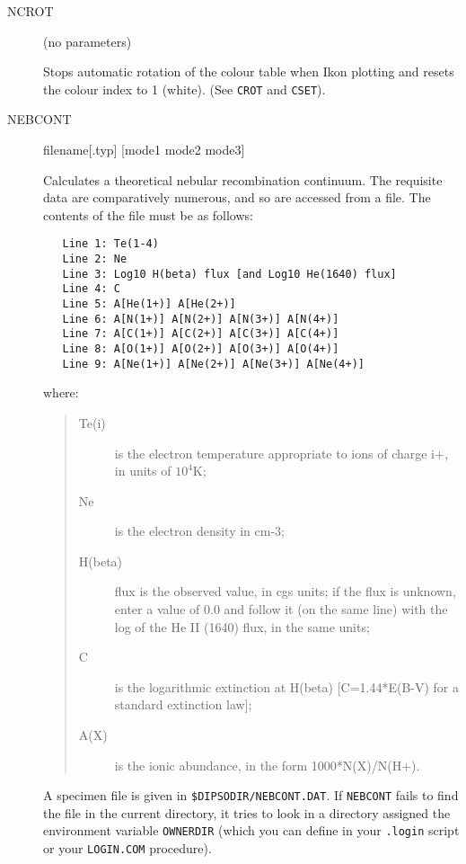 \documentclass[twoside,11pt]{article}
\newcommand{\htmlref}[2]{#1}
\newcommand{\xlabel}[1]{}
\renewcommand{\_}{\texttt{\symbol{95}}}
\newcommand{\dipcom}[3] { \item [{#1}] {#2} \par }
\newcommand{\dipcom}[3] { \end{description}
                            \subsection{\xlabel{#1}{#1} - {#3}}
                            \label{COM:#1}
                            \begin{description}
                            \item [Syntax:] {\tt{#1} {#2}}
                            \par
                            \item [Description:]}
\begin{document}
\begin {description}
\dipcom{NCROT}{(no parameters)}{Stops automatic rotation of the colour table}
Stops automatic rotation of the colour table when Ikon plotting and
resets the colour index to 1 (white). (See \htmlref{{\tt{CROT}}}{COM:CROT}  and \htmlref{{\tt{CSET}}}{COM:CSET}). 

\dipcom{NEBCONT}{filename[.typ] [mode1 mode2 mode3]}{Calculates a theoretical nebular re-combination continuum}
Calculates a theoretical nebular recombination continuum. The
requisite data are comparatively numerous, and so are accessed from a
file. The contents of the file must be as follows:

\begin{verbatim}
   Line 1: Te(1-4)
   Line 2: Ne
   Line 3: Log10 H(beta) flux [and Log10 He(1640) flux]
   Line 4: C
   Line 5: A[He(1+)] A[He(2+)]
   Line 6: A[N(1+)] A[N(2+)] A[N(3+)] A[N(4+)]
   Line 7: A[C(1+)] A[C(2+)] A[C(3+)] A[C(4+)]
   Line 8: A[O(1+)] A[O(2+)] A[O(3+)] A[O(4+)]
   Line 9: A[Ne(1+)] A[Ne(2+)] A[Ne(3+)] A[Ne(4+)]
\end{verbatim}

where:

\begin{quote}
\begin{description}

\item [Te(i)] is the electron temperature appropriate to ions of
charge i+, in units of $10^{4}$K;

\item [Ne] is the electron density in cm-3;

\item [H(beta)] flux is the observed value, in cgs units; if the flux
is unknown, enter a value of 0.0 and follow it (on the same line) with
the log of the He II (1640) flux, in the same units;

\item [C] is the logarithmic extinction at H(beta) [C=1.44*E(B-V) for
a standard extinction law];

\item [A(X)] is the ionic abundance, in the form 1000*N(X)/N(H+).

\end{description}
\end{quote}

A specimen file is given in {\tt{\$DIPSODIR/NEBCONT.DAT}}. 
If \htmlref{{\tt{NEBCONT}}}{COM:NEBCONT}  fails to find the
file in the current directory, it tries to look in a directory
assigned the environment variable {\tt{OWNERDIR}}  (which
you can define in your {\tt{.login}}  script or your {\tt{LOGIN.COM}}  procedure).


\end{description}
\end{document}
